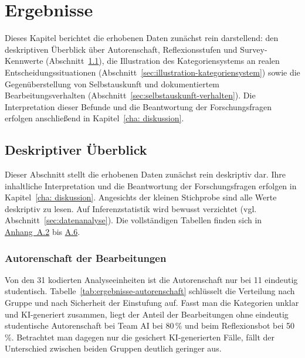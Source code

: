 \chapter{Ergebnisse}
\label{cha:ergebnisse}

Dieses Kapitel berichtet die erhobenen Daten zunächst rein darstellend: den deskriptiven Überblick
über Autorenschaft, Reflexionsstufen und Survey-Kennwerte (Abschnitt~\ref{sec:ergebnisse}), die
Illustration des Kategoriensystems an realen Entscheidungssituationen
(Abschnitt~\ref{sec:illustration-kategoriensystem}) sowie die Gegenüberstellung von Selbstauskunft und
dokumentiertem Bearbeitungsverhalten (Abschnitt~\ref{sec:selbstauskunft-verhalten}). Die
Interpretation dieser Befunde und die Beantwortung der Forschungsfragen erfolgen anschließend in
Kapitel~\ref{cha: diskussion}.

\section{Deskriptiver Überblick}
\label{sec:ergebnisse}

Dieser Abschnitt stellt die erhobenen Daten zunächst rein deskriptiv dar. Ihre inhaltliche
Interpretation und die Beantwortung der Forschungsfragen erfolgen in Kapitel~\ref{cha: diskussion}.
Angesichts der kleinen Stichprobe sind alle Werte deskriptiv zu lesen. Auf Inferenzstatistik wird
bewusst verzichtet (vgl. Abschnitt~\ref{sec:datenanalyse}). Die vollständigen Tabellen finden sich in
\hyperref[app:kodierungstabelle]{Anhang~A.2} bis \hyperref[app:statistik]{A.6}.

\subsection*{Autorenschaft der Bearbeitungen}
Von den 31 kodierten Analyseeinheiten ist die Autorenschaft nur bei 11 eindeutig studentisch.
Tabelle~\ref{tab:ergebnisse-autorenschaft} schlüsselt die Verteilung nach Gruppe und nach Sicherheit
der Einstufung auf. Fasst man die Kategorien \glqq unklar\grqq{} und \glqq KI-generiert\grqq{}
zusammen, liegt der Anteil der Bearbeitungen ohne eindeutig studentische Autorenschaft bei Team AI bei
80\,\% und beim Reflexionsbot bei 50\,\%. Betrachtet man dagegen nur die gesichert KI-generierten
Fälle, fällt der Unterschied zwischen beiden Gruppen deutlich geringer aus.

